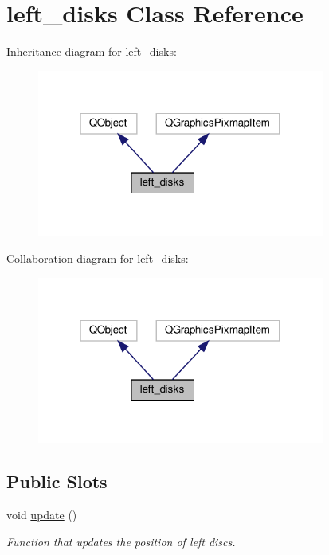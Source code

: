 \hypertarget{classleft__disks}{}\section{left\+\_\+disks Class Reference}
\label{classleft__disks}


Inheritance diagram for left\+\_\+disks\+:\nopagebreak
\begin{figure}[H]
\begin{center}
\leavevmode
\includegraphics[width=268pt]{classleft__disks__inherit__graph}
\end{center}
\end{figure}


Collaboration diagram for left\+\_\+disks\+:\nopagebreak
\begin{figure}[H]
\begin{center}
\leavevmode
\includegraphics[width=268pt]{classleft__disks__coll__graph}
\end{center}
\end{figure}
\subsection*{Public Slots}
\begin{DoxyCompactItemize}
\item 
void \hyperlink{classleft__disks_a613675662c3b7d427671ca6aa2aa4fc4}{update} ()
\begin{DoxyCompactList}\small\item\em Function that updates the position of left discs. \end{DoxyCompactList}\end{DoxyCompactItemize}
